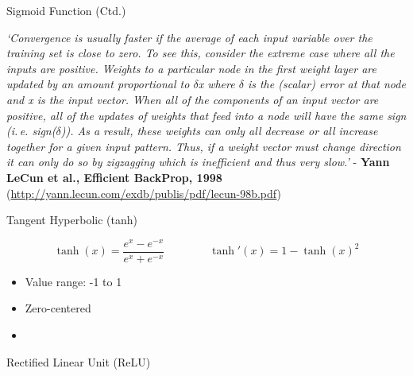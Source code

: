 \begin{frame}{Sigmoid Function (Ctd.)}{}
	\begin{boxBlueNoFrame}
		\footnotesize
		\textit{`Convergence is usually faster if the average of each input variable over the training set is close to zero.
		To see this, consider the extreme case where all the inputs are positive. Weights to a particular node in the first weight layer are updated by an amount
		proportional to $\delta$x where $\delta$ is the (scalar) error at that node and x is the input vector. When all of the components of an input vector are
		positive, all of the updates of weights that feed into a node will have the same sign (i.\,e. sign($\delta$)). As a result, these weights can only all decrease
		or all increase together for a given input pattern. Thus, if a weight vector must change direction it can only do so by zigzagging which is inefficient and thus
		very slow.'} - \textbf{Yann LeCun et al., Efficient BackProp, 1998} (\url{http://yann.lecun.com/exdb/publis/pdf/lecun-98b.pdf})
	\end{boxBlueNoFrame}
\end{frame}


\begin{frame}{Tangent Hyperbolic (tanh)}{}
	\begin{boxBlueNoFrame}
		\begin{equation*}
			\tanh(x) = \frac{e^x - e^{-x}}{e^x + e^{-x}} \qquad\qquad
			\tanh'(x) = 1 - \tanh(x)^2
		\end{equation*}
	\end{boxBlueNoFrame}
	
	\begin{itemize}
		\item Value range: -1 to 1
		\item Zero-centered
		\item {}
	\end{itemize}
\end{frame}


\begin{frame}{Rectified Linear Unit (ReLU)}{}\important
\end{frame}


